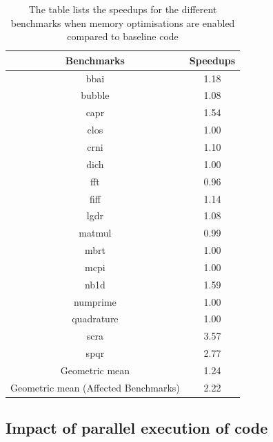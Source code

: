 \begin{table}[htbp]
\centering
\begin{tabular}{|c|c|}
\hline
Benchmarks                           & Speedups \\ \hline
bbai                                 & 1.18     \\ \hline
bubble                               & 1.08     \\ \hline
capr                                 & 1.54     \\ \hline
clos                                 & 1.00     \\ \hline
crni                                 & 1.10     \\ \hline
dich                                 & 1.00     \\ \hline
fft                                  & 0.96     \\ \hline
fiff                                 & 1.14     \\ \hline
lgdr                                 & 1.08     \\ \hline
matmul                               & 0.99     \\ \hline
mbrt                                 & 1.00     \\ \hline
mcpi                                 & 1.00     \\ \hline
nb1d                                 & 1.59     \\ \hline
numprime                             & 1.00     \\ \hline
quadrature                           & 1.00     \\ \hline
scra                                 & 3.57     \\ \hline
spqr                                 & 2.77     \\ \hline
Geometric mean                       & 1.24     \\ \hline
Geometric mean (Affected Benchmarks) & 2.22     \\ \hline
\end{tabular}
\caption[Speedup of \velocty code when memory optimisations are enabled]{The table lists the speedups for the different \matlab benchmarks when memory optimisations are enabled compared to baseline \velocty code}
\label{tab:cmvscwo}
\end{table}
\subsection{Impact of parallel execution of \velocty code}

